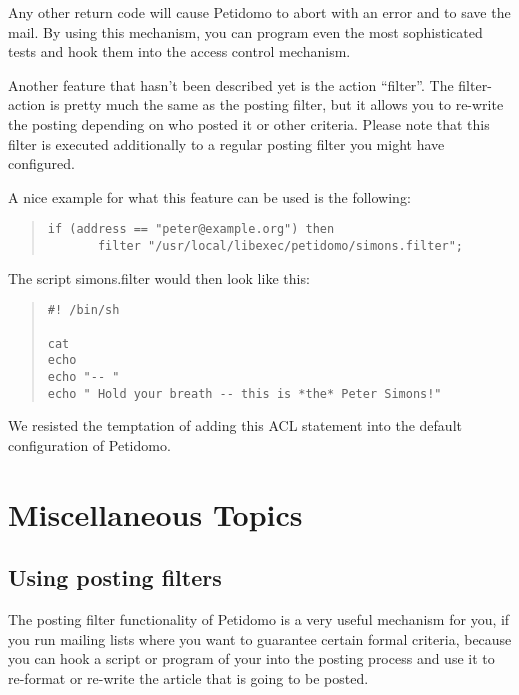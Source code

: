 \documentclass[a4paper,11pt]{scrreprt}
\newcommand{\file}[1]{{\sf #1}}
\begin{document}
Any other return code will cause Petidomo to abort with an error and
to save the mail. By using this mechanism, you can program even the
most sophisticated tests and hook them into the access control
mechanism.

Another feature that hasn't been described yet is the action
``filter''. The filter-action is pretty much the same as the posting
filter, but it allows you to re-write the posting depending on who
posted it or other criteria. Please note that this filter is executed
additionally to a regular posting filter you might have configured.

A nice example for what this feature can be used is the following:
\begin{quote}
\begin{verbatim}
if (address == "peter@example.org") then
       filter "/usr/local/libexec/petidomo/simons.filter";
\end{verbatim}
\end{quote}

The script \file{simons.filter} would then look like this:
\begin{quote}
\begin{verbatim}
#! /bin/sh

cat
echo
echo "-- "
echo " Hold your breath -- this is *the* Peter Simons!"
\end{verbatim}
\end{quote}

We resisted the temptation of adding this ACL statement into the
default configuration of Petidomo.

%
\chapter{Miscellaneous Topics}
\section{Using posting filters}
\label{using posting filters}

The posting filter functionality of Petidomo is a very useful
mechanism for you, if you run mailing lists where you want to
guarantee certain formal criteria, because you can hook a script or
program of your into the posting process and use it to re-format or
re-write the article that is going to be posted.
\end{document}
